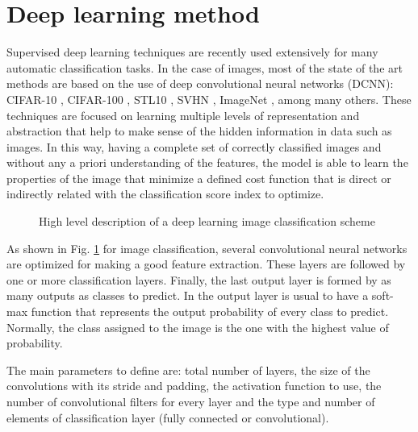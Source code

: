 \documentclass[times,twocolumn,final,authoryear]{elsarticle}
\begin{document}
\section{Deep learning method}

Supervised deep learning techniques are recently used extensively for many automatic classification tasks. In the case of images, most of the state of the art methods are based on the use of deep convolutional neural networks (DCNN): CIFAR-10 \citep{DBLP:journals/corr/Graham14a}, CIFAR-100 \citep{DBLP:journals/corr/ClevertUH15}, STL10 \citep{DBLP:journals/corr/DundarJC15}, SVHN \citep{DBLP:journals/corr/LiaoC15a}, ImageNet \citep{NIPS2012_4824}, among many others. These techniques are focused on learning multiple levels of representation and abstraction that help to make sense of the hidden information in data such as images. In this way, having a complete set of correctly classified images and without any a priori understanding of the features, the model is able to learn the properties of the image that minimize a defined cost function that is direct or indirectly related with the classification score index to optimize. 

\begin{figure}[!h]
	\centering
	\caption{High level description of a deep learning image classification scheme}
	\label{fig:classification}
\end{figure}


As shown in Fig. \ref{fig:classification} for image classification, several convolutional neural networks are optimized for making  a good feature extraction. These layers are followed by one or more classification layers. Finally, the last output layer is formed by as many outputs as classes to predict. In the output layer is usual to have a soft-max function that represents the output probability of every class to predict. Normally, the class assigned to the image is the one with the highest value of probability. 

The main parameters to define are: total number of layers, the size of the convolutions with its stride and padding, the activation function to use, the number of convolutional filters for every layer and the type and number of elements of classification layer (fully connected or convolutional).
\end{document}
